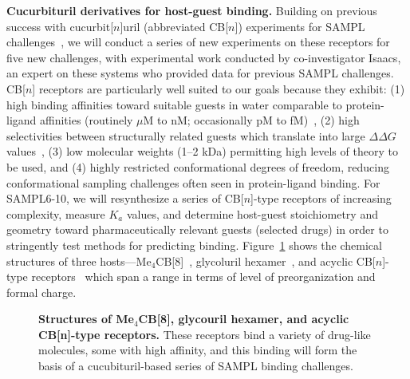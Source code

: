 \documentclass[11pt]{article}
\begin{document}
\textbf{Cucurbituril derivatives for host-guest binding.} 
Building on previous success with cucurbit[$n$]uril (abbreviated CB[$n$]) experiments for SAMPL challenges~\cite{ma_acyclic_2012-2, cao_absolute_2014, she_glycoluril-derived_2016}, we will conduct a series of new experiments on these receptors for five new challenges,
 with experimental work conducted by co-investigator Isaacs, an expert on these systems who provided data for previous SAMPL challenges.
CB[$n$] receptors are particularly well suited to our goals because they exhibit: (1) high binding affinities toward suitable guests in water comparable to protein-ligand affinities (routinely $\mu$M to nM; occasionally pM to fM)~\cite{cao_attomolar_2014, liu_cucurbituril_2005, mock_structure_1986, assaf_cucurbiturils:_2015, moghaddam_new_2011, shetty_can_2015, biedermann_release_2012}, (2) high selectivities between structurally related guests which translate into large $\Delta \Delta G$ values~\cite{isaacs_stimuli_2014}, (3) low molecular weights (1--2 kDa) permitting high levels of theory to be used, and (4) highly restricted conformational degrees of freedom, reducing conformational sampling challenges often seen in protein-ligand binding.
For SAMPL6-10, we will resynthesize a series of CB[$n$]-type receptors of increasing complexity, measure $K_a$ values, and determine host-guest stoichiometry and geometry toward pharmaceutically relevant guests (selected drugs) in order to stringently test methods for predicting binding.  
Figure~\ref{figure:CB} shows the chemical structures of three hosts---Me$_4$CB[8]~\cite{vinciguerra_synthesis_2015}, glycoluril hexamer~\cite{lucas_templated_2011}, and acyclic CB[$n$]-type receptors~\cite{ma_acyclic_2012, ma_acyclic_2012-1, zhang_acyclic_2014, gilberg_acyclic_2015, sigwalt_acyclic_2016, zhang_acyclic_2014-1} which span a range in terms of level of preorganization and formal charge.

\begin{figure}[h]
\begin{centering}

\end{centering}

\vspace{0.1in}
\caption{\label{figure:CB} \footnotesize {\bf Structures of Me$_4$CB[8], glycouril hexamer, and acyclic CB[n]-type receptors.} These receptors bind a variety of drug-like molecules, some with high affinity, and this binding will form the basis of a cucubituril-based series of SAMPL binding challenges.}

\end{figure}
\end{document}

